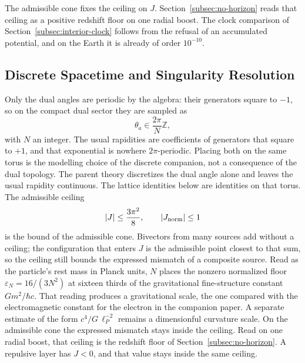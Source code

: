 \documentclass[a4paper]{article}
\begin{document}
The admissible cone fixes the ceiling on \(J\). Section~\ref{subsec:no-horizon} reads that ceiling as a positive redshift floor on one radial boost. The clock comparison of Section~\ref{subsec:interior-clock} follows from the refusal of an accumulated potential, and on the Earth it is already of order \(10^{-10}\).

\subsection{Discrete Spacetime and Singularity Resolution}

Only the dual angles are periodic by the algebra: their generators square to $-1$, so on the compact dual sector they are sampled as
\[
\theta_a \in \frac{2\pi}{N}\mathbb{Z},
\]
with \(N\) an integer. The usual rapidities are coefficients of generators that square to $+1$, and that exponential is nowhere $2\pi$-periodic. Placing both on the same torus is the modelling choice of the discrete companion, not a consequence of the dual topology. The parent theory discretizes the dual angle alone and leaves the usual rapidity continuous. The lattice identities below are identities on that torus. The admissible ceiling
\[
|J| \le \frac{3\pi^2}{8}, \qquad |J_{\rm norm}|\le 1
\]
is the bound of the admissible cone. Bivectors from many sources add without a ceiling; the configuration that enters \(J\) is the admissible point closest to that sum, so the ceiling still bounds the expressed mismatch of a composite source. Read as the particle's rest mass in Planck units, \(N\) places the nonzero normalized floor \(\varepsilon_N=16/(3N^2)\) at sixteen thirds of the gravitational fine-structure constant \(G m^2/\hbar c\). That reading produces a gravitational scale, the one compared with the electromagnetic constant for the electron in the companion paper. A separate estimate of the form \(c^4/G\,\ell_P^{-2}\) remains a dimensionful curvature scale. On the admissible cone the expressed mismatch stays inside the ceiling. Read on one radial boost, that ceiling is the redshift floor of Section~\ref{subsec:no-horizon}. A repulsive layer has \(J<0\), and that value stays inside the same ceiling.
\end{document}
